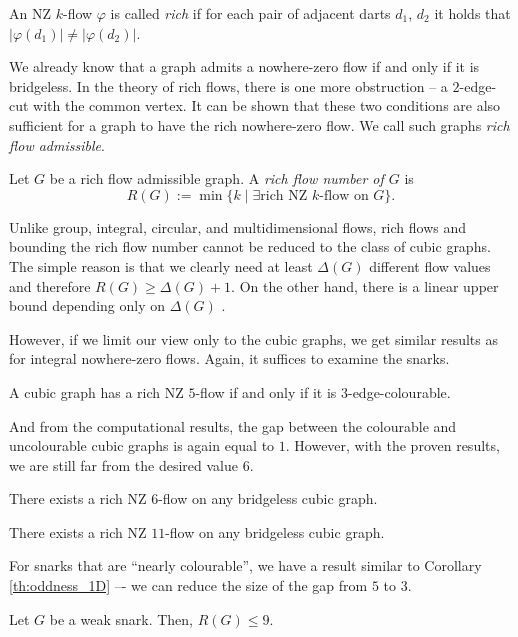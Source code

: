 \begin{definition}
An NZ $k$-flow $\varphi$ is called \emph{rich} if for each pair of adjacent darts $d_1$, $d_2$ it holds that $\left|\varphi\left(d_1\right)\right|\neq\left|\varphi\left(d_2\right)\right|$.
\end{definition}

We already know that a graph admits a nowhere-zero flow if and only if it is bridgeless. In the theory of rich flows, there is one more obstruction – a $2$-edge-cut with the common vertex. It can be shown that these two conditions are also sufficient for a graph to have the rich nowhere-zero flow. We call such graphs \emph{rich flow admissible}.

\begin{definition}
Let $G$ be a rich flow admissible graph. A \emph{rich flow number of $G$} is
\begin{equation*}
R(G) := \min\{k\mid\exists\text{rich NZ } k\text{-flow on }G\}.
\end{equation*}
\end{definition}

Unlike group, integral, circular, and multidimensional flows, rich flows and bounding the rich flow number cannot be reduced to the class of cubic graphs. The simple reason is that we clearly need at least $\Delta(G)$ different flow values and therefore $R(G)\geq\Delta(G)+1$. On the other hand, there is a linear upper bound depending only on $\Delta(G)$ \cite{rich_flows_not_cubic}.

However, if we limit our view only to the cubic graphs, we get similar results as for integral nowhere-zero flows. Again, it suffices to examine the snarks.
\begin{proposition} \emph{\cite[p. 31]{rich_flows}}
A cubic graph has a rich NZ $5$-flow if and only if it is $3$-edge-colourable.
\end{proposition}

And from the computational results, the gap between the colourable and uncolourable cubic graphs is again equal to $1$. However, with the proven results, we are still far from the desired value $6$.
\begin{conjecture} \emph{\cite[p. 33]{rich_flows}}
There exists a rich NZ $6$-flow on any bridgeless cubic graph.
\end{conjecture}

\begin{proposition} \emph{\cite[p. 33]{rich_flows}}
There exists a rich NZ $11$-flow on any bridgeless cubic graph.
\end{proposition}

For snarks that are ``nearly colourable'', we have a result similar to Corollary \ref{th:oddness_1D} –- we can reduce the size of the gap from $5$ to $3$.
\begin{proposition} \emph{\cite[p. 40]{rich_flows}}
Let $G$ be a weak snark. Then, $R(G)\leq 9$. \label{prop:weak_rich_flow}
\end{proposition}
